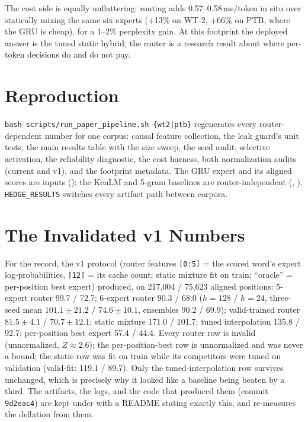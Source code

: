 \documentclass[11pt]{article}
\begin{document}
The cost side is equally unflattering: routing adds 0.57--0.58\,ms/token in
situ over statically mixing the same six experts (+13\% on WT-2, +66\% on PTB,
where the GRU is cheap), for a 1--2\% perplexity gain. At this footprint the
deployed answer is the tuned static hybrid; the router is a research result
about where per-token decisions do and do not pay.



\appendix

\section{Reproduction}

\texttt{bash scripts/run\_paper\_pipeline.sh \{wt2|ptb\}} regenerates every
router-dependent number for one corpus: causal feature collection, the leak
guard's unit tests, the main results table with the size sweep, the seed audit,
selective activation, the reliability diagnostic, the cost harness, both
normalization audits (current and v1), and the footprint metadata. The GRU
expert and its aligned scores are inputs
(); the KenLM and 5-gram baselines
are router-independent (,
). \texttt{HEDGE\_RESULTS} switches every
artifact path between corpora.

\section{The Invalidated v1 Numbers}

For the record, the v1 protocol (router features \texttt{[0:5]} = the scored
word's expert log-probabilities, \texttt{[12]} = its cache count; static
mixture fit on train; ``oracle'' = per-position best expert) produced, on
217{,}004 / 75{,}623 aligned positions: 5-expert router 99.7 / 72.7; 6-expert
router 90.3 / 68.0 ($h=128$ / $h=24$, three-seed mean $101.1\pm21.2$ /
$74.6\pm10.1$, ensembles 90.2 / 69.9); valid-trained router $81.5\pm4.1$ /
$70.7\pm12.1$; static mixture 171.0 / 101.7; tuned interpolation 135.8 / 92.7;
per-position best expert 57.4 / 44.4. Every router row is invalid
(unnormalized, $Z\approx2.6$); the per-position-best row is unnormalized and
was never a bound; the static row was fit on train while its competitors were
tuned on validation (valid-fit: 119.1 / 89.7). Only the tuned-interpolation row
survives unchanged, which is precisely why it looked like a baseline being
beaten by a third. The artifacts, the
logs, and the code that produced them (commit \texttt{9d2eac4}) are kept under
 with a README stating exactly
this, and  re-measures the
deflation from them.
\end{document}
